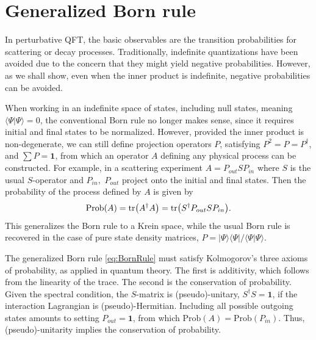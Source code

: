 \documentclass[pra,aps,amsmath,amssymb,notitlepage, twocolumn,superscriptaddress,longbibliography,nofootinbib,floatfix,10pt]{revtex4-2}
\begin{document}
\section{Generalized Born rule}

In perturbative QFT, the basic observables are the transition probabilities for scattering or decay processes. Traditionally, indefinite quantizations have been avoided due to the concern that they might yield negative probabilities. However, as we shall show, even when the inner product is indefinite, negative probabilities can be avoided.



When working in an indefinite space of states, including null states, meaning $\langle\Psi|\Psi\rangle=0$, the conventional Born rule no longer makes sense, since it requires initial and final states to be normalized. However, provided the inner product is non-degenerate, we can still define projection operators $P$, satisfying $P^2=P=P^\dagger$, and $\sum P=\mathbf{1}$, from which an operator $A$ defining any physical process can be constructed. For example, in a scattering experiment $A= P_{out} S P_{in}$ where $S$ is the usual $S$-operator and $P_{in},$ $P_{out}$ project onto the initial and final states. Then the probability of the process defined by  $A$ is given by
\begin{equation}\label{eq:BornRule}
    \text{Prob}(A) = {\rm tr}\bigl(A^\dagger A\bigr)={\rm tr}\bigl(S^\dagger  P_{out} S P_{in}\bigr).
\end{equation}
This generalizes the Born rule to a Krein space, while the usual Born rule is recovered in the case of pure state density matrices, $P=|\Psi\rangle\langle\Psi|/\langle\Psi|\Psi\rangle$.

The generalized Born rule \eqref{eq:BornRule} must satisfy Kolmogorov's three axioms of probability, as applied in quantum theory. The first is additivity, which follows from the linearity of the trace. The second is the conservation of probability. Given the spectral condition, the $S$-matrix is (pseudo)-unitary, $S^\dagger S= \mathbf{1}$, if the interaction Lagrangian is (pseudo)-Hermitian.
Including all possible outgoing states amounts to setting $P_{out}=\mathbf{1}$, from which $\text{Prob}(A)=\text{Prob}(P_{in})$. Thus, (pseudo)-unitarity implies the conservation of probability.
\end{document}

